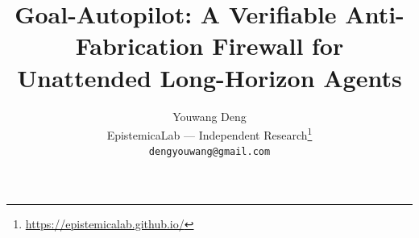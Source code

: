 \documentclass{article}
\title{Goal-Autopilot: A Verifiable Anti-Fabrication Firewall for Unattended Long-Horizon Agents}
\author{Youwang Deng \\
EpistemicaLab --- Independent Research\thanks{\url{https://epistemicalab.github.io/}} \\
\texttt{dengyouwang@gmail.com}}
\begin{document}
\maketitle

\begin{abstract}

\end{abstract}



\nocite{wu2024stateflow,shinn2023reflexion,madaan2023selfrefine,yao2023react,wu2023autogen,langgraph2024,geifman2017selective}




\end{document}
